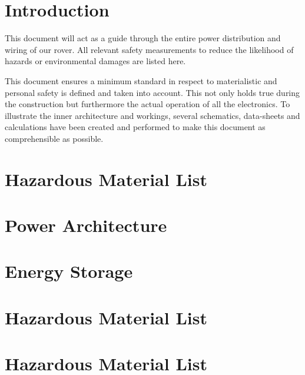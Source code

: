 \section{Introduction}

This document will act as a guide through the entire power distribution and wiring of our rover. All relevant safety measurements to reduce the likelihood of hazards or environmental damages are listed here. 

This document ensures a minimum standard in respect to materialistic and personal safety is defined and taken into account. This not only holds true during the construction but furthermore the actual operation of all the electronics. To illustrate the inner architecture and workings, several schematics, data-sheets and calculations have been created and performed to make this document as comprehensible as possible. 

\section{Hazardous Material List}


\section{Power Architecture}

\section{Energy Storage}
\section{Hazardous Material List}
\section{Hazardous Material List}


